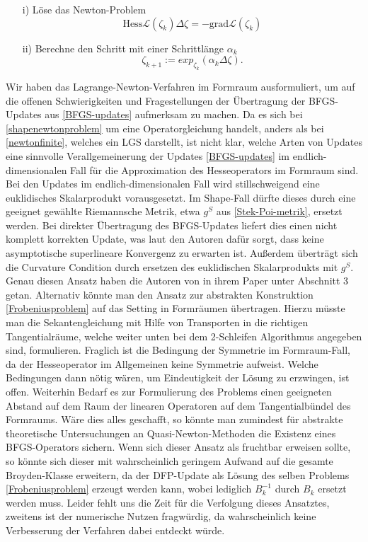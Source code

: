 \begin{itemize}
	\item[i)] Löse das Newton-Problem \\
	\begin{equation}\label{shapenewtonproblem}
	\text{Hess}\mathcal{L}(\zeta_k)\Delta \zeta = - \text{grad} \mathcal{L}(\zeta_k)
	\end{equation}
	\item[ii)] Berechne den Schritt mit einer Schrittlänge $\alpha_k$
	\begin{equation}
	\zeta_{k+1} := exp_{\zeta_k}(\alpha_k \Delta \zeta).
	\end{equation}
\end{itemize}
Wir haben das Lagrange-Newton-Verfahren im Formraum ausformuliert, um auf die offenen Schwierigkeiten und Fragestellungen der Übertragung der BFGS-Updates aus \ref{BFGS-updates} aufmerksam zu machen. Da es sich bei 
\ref{shapenewtonproblem} um eine Operatorgleichung handelt, anders als bei \ref{newtonfinite}, welches ein LGS darstellt, ist nicht klar, welche Arten von Updates eine sinnvolle Verallgemeinerung der Updates \ref{BFGS-updates} im endlich-dimensionalen Fall für die Approximation des Hesseoperators im Formraum sind. Bei den Updates im endlich-dimensionalen Fall wird stillschweigend eine euklidisches Skalarprodukt vorausgesetzt. Im Shape-Fall dürfte dieses durch eine geeignet gewählte Riemannsche Metrik, etwa $g^S$ aus \ref{Stek-Poi-metrik}, ersetzt werden. Bei direkter Übertragung des BFGS-Updates liefert dies einen nicht komplett korrekten Update, was laut den Autoren dafür sorgt, dass keine asymptotische superlineare Konvergenz zu erwarten ist. Außerdem überträgt sich die Curvature Condition durch ersetzen des euklidischen Skalarprodukts mit $g^S$. Genau diesen Ansatz haben die Autoren von \cite{diffusion} in ihrem Paper unter Abschnitt 3 getan. Alternativ könnte man den Ansatz zur abstrakten Konstruktion \ref{Frobeniusproblem} auf das Setting in Formräumen übertragen. Hierzu müsste man die Sekantengleichung mit Hilfe von Transporten in die richtigen Tangentialräume, welche weiter unten bei dem 2-Schleifen Algorithmus angegeben sind, formulieren. Fraglich ist die Bedingung der Symmetrie im Formraum-Fall, da der Hesseoperator im Allgemeinen keine Symmetrie aufweist. Welche Bedingungen dann nötig wären, um Eindeutigkeit der Lösung zu erzwingen, ist offen. Weiterhin Bedarf es zur Formulierung des Problems einen geeigneten Abstand auf dem Raum der linearen Operatoren auf dem Tangentialbündel des Formraums. Wäre dies alles geschafft, so könnte man zumindest für abstrakte theoretische Untersuchungen an Quasi-Newton-Methoden die Existenz eines BFGS-Operators sichern. Wenn sich dieser Ansatz als fruchtbar erweisen sollte, so könnte sich dieser mit wahrscheinlich geringem Aufwand auf die gesamte Broyden-Klasse erweitern, da der DFP-Update als Lösung des selben Problems \ref{Frobeniusproblem} erzeugt werden kann, wobei lediglich $B_k^{-1}$ durch $B_k$ ersetzt werden muss. Leider fehlt uns die Zeit für die Verfolgung dieses Ansatztes, zweitens ist der numerische Nutzen fragwürdig, da wahrscheinlich keine Verbesserung der Verfahren dabei entdeckt würde. 

